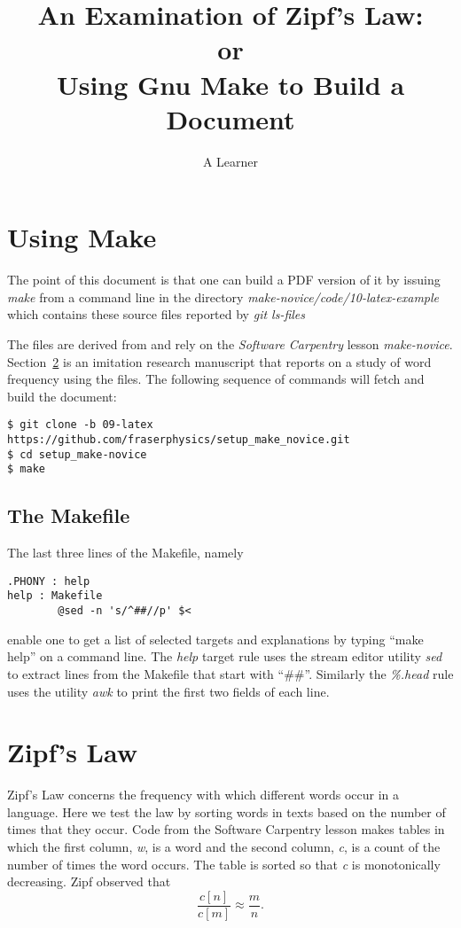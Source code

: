 \documentclass[]{article}
\title{An Examination of Zipf's Law:\\ or\\ Using Gnu Make to Build a
  Document}
\author{A Learner}
\begin{document}
\maketitle

\section{Using Make}
\label{sec:make}

The point of this document is that one can build a PDF version of it
by issuing \emph{make} from a command line in the directory
\emph{make-novice/code/10-latex-example} which contains these
source files reported by \emph{git ls-files}
%

%
The files are derived from and rely on the \emph{Software
  Carpentry}\cite{software-carpentry} lesson \emph{make-novice}.
Section~\ref{sec:zipf} is an imitation research manuscript that
reports on a study of word frequency using the files.  The following
sequence of commands will fetch and build the document:
\begin{verbatim}
$ git clone -b 09-latex https://github.com/fraserphysics/setup_make_novice.git
$ cd setup_make-novice
$ make
\end{verbatim}

\subsection{The Makefile}
\label{sec:makefile}

The last three lines of the Makefile, namely
\begin{verbatim}
.PHONY : help
help : Makefile
        @sed -n 's/^##//p' $<
\end{verbatim}
enable one to get a list of selected targets and explanations by
typing ``make help'' on a command line.  The \emph{help} target rule
uses the stream editor utility \emph{sed} to extract lines from the
Makefile that start with ``\#\#''.  Similarly the \emph{\%.head} rule
uses the utility \emph{awk} to print the first two fields of each
line.

\section{Zipf's Law}
\label{sec:zipf}

Zipf's Law\cite{Zipf} concerns the frequency with which different
words occur in a language.  Here we test the law by sorting words in
texts based on the number of times that they occur.  Code from the
Software Carpentry lesson makes tables in which the first column,
\emph{w}, is a word and the second column, \emph{c}, is a count of the
number of times the word occurs.  The table is sorted so that \emph{c}
is monotonically decreasing.  Zipf observed that
\begin{equation}
  \frac{c[n]}{c[m]} \approx \frac{m}{n}.
\end{equation}
\end{document}
